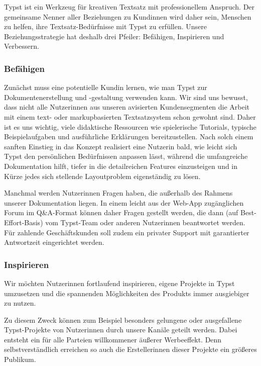 \documentclass[11pt, a4paper]{article}
\newcommand{\gender}{\raisebox{-.25em}{*}}
\begin{document}
Typst ist ein Werkzeug für kreativen Textsatz mit professionellem Anspruch. Der gemeinsame Nenner aller Beziehungen zu Kund\gender{}innen wird daher sein, Menschen zu helfen, ihre Textsatz-Bedürfnisse mit Typst zu erfüllen. Unsere Beziehungsstrategie hat deshalb drei Pfeiler: Befähigen, Inspirieren und Verbessern.

\subsubsection*{Befähigen}

Zunächst muss ein\gender{}e potentielle\gender{} Kund\gender{}in lernen, wie man Typst zur Dokumentenerstellung und -gestaltung verwenden kann. Wir sind uns bewusst, dass nicht alle Nutzer\gender{}innen aus unseren avisierten Kundensegmenten die Arbeit mit einem text- oder markupbasierten Textsatzsystem schon gewohnt sind. Daher ist es uns wichtig, viele didaktische Ressourcen wie spielerische Tutorials, typische Beispielaufgaben und ausführliche Erklärungen bereitzustellen. Nach solch einem sanften Einstieg in das Konzept realisiert ein\gender{}e Nutzer\gender{}in bald, wie leicht sich Typst den persönlichen Bedürfnissen anpassen lässt, während die umfangreiche Dokumentation hilft, tiefer in die detailreichen Features einzusteigen und in Kürze jedes sich stellende Layoutproblem eigenständig zu lösen.

Manchmal werden Nutzer\gender{}innen Fragen haben, die außerhalb des Rahmens unserer Dokumentation liegen. In einem leicht aus der Web-App zugänglichen Forum im Q\&A-Format können daher Fragen gestellt werden, die dann (auf Best-Effort-Basis) vom Typst-Team oder anderen Nutzer\gender{}innen beantwortet werden. Für zahlende Geschäftskunden soll zudem ein privater Support mit garantierter Antwortzeit eingerichtet werden.

\subsubsection*{Inspirieren}

Wir möchten Nutzer\gender{}innen fortlaufend inspirieren, eigene Projekte in Typst umzusetzen und die spannenden Möglichkeiten des Produkts immer ausgiebiger zu nutzen.

Zu diesem Zweck können zum Beispiel besonders gelungene oder ausgefallene Typst-Projekte von Nutzer\gender{}innen durch unsere Kanäle geteilt werden. Dabei entsteht ein für alle Parteien willkommener äußerer Werbeeffekt. Denn selbstverständlich erreichen so auch die Ersteller\gender{}innen dieser Projekte ein größeres Publikum.
\end{document}
